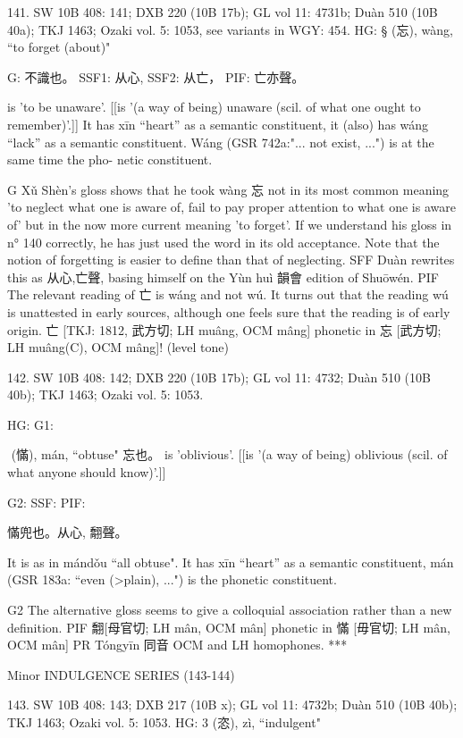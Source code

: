 141. SW 10B 408: 141; DXB 220 (10B 17b); GL vol 11: 4731b; Duàn 510 (10B 40a); TKJ 1463; Ozaki vol. 5: 1053, see
variants in WGY: 454.
HG: § (忘), wàng, ``to forget (about)"

G:	不識也。
SSF1: 从心,
SSF2: 从亡， PIF: 亡亦聲。

is 'to be unaware'. [[is '(a way of being) unaware (scil. of what one ought to remember)'.]]
It has xīn ``heart'' as a semantic constituent,
it (also) has wáng ``lack'' as a semantic constituent.
Wáng (GSR 742a:"... not exist, ...") is at the same time the pho- netic constituent.

G Xǔ Shèn's gloss shows that he took wàng 忘 not in its most common meaning 'to neglect what one is aware of, fail to pay proper attention to what one is aware of' but in the now more current meaning 'to forget'. If we understand his gloss in n° 140 correctly, he has just used the word in its old acceptance. Note that the notion of forgetting is easier to define than that of neglecting.
SFF     Duàn rewrites this as 从心,亡聲, basing himself on the Yùn huì 韻會 edition of Shuōwén.
PIF     The relevant reading of 亡 is wáng and not wú. It turns out that the reading wú is unattested in early sources, although one feels sure that the reading is of early origin.
    亡 [TKJ: 1812, 武方切; LH muâng, OCM mâng] phonetic in 忘 [武方切; LH muâng(C), OCM mâng]! (level tone)


142. SW 10B 408: 142; DXB 220 (10B 17b); GL vol 11: 4732; Duàn 510 (10B 40b); TKJ 1463; Ozaki vol. 5: 1053.


HG:
G1:

 (慲), mán, ``obtuse"
忘也。	is 'oblivious'. [[is '(a way of being) oblivious (scil. of what anyone should know)'.]]




G2: SSF: PIF:

慲兜也。从心,
䎗聲。

It is as in mándǒu ``all obtuse".
It has xīn ``heart'' as a semantic constituent,
mán (GSR 183a: ``even (>plain), ...") is the phonetic constituent.

G2 The alternative gloss seems to give a colloquial association rather than a new definition.
PIF     䎗[母官切; LH mân, OCM mân] phonetic in 慲 [毋官切; LH mân, OCM mân]
PR	Tóngyīn 同音 OCM and LH homophones.
***

Minor INDULGENCE SERIES (143-144)

143. SW 10B 408: 143; DXB 217 (10B x); GL vol 11: 4732b; Duàn 510 (10B 40b); TKJ 1463; Ozaki vol. 5: 1053.
HG: 3 (恣), zì, ``indulgent"

